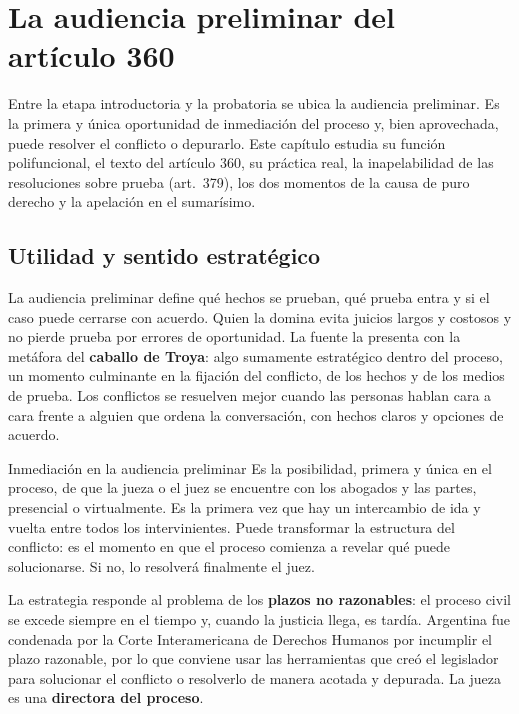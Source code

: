 \documentclass[12pt,oneside]{book}
\begin{document}
\chapter{La audiencia preliminar del artículo 360}\label{cap:audiencia}

Entre la etapa introductoria y la probatoria se ubica la audiencia preliminar. Es la primera y única oportunidad de inmediación del proceso y, bien aprovechada, puede resolver el conflicto o depurarlo. Este capítulo estudia su función polifuncional, el texto del artículo 360, su práctica real, la inapelabilidad de las resoluciones sobre prueba (art.~379), los dos momentos de la causa de puro derecho y la apelación en el sumarísimo.

\section{Utilidad y sentido estratégico}

La audiencia preliminar define qué hechos se prueban, qué prueba entra y si el caso puede cerrarse con acuerdo. Quien la domina evita juicios largos y costosos y no pierde prueba por errores de oportunidad. La fuente la presenta con la metáfora del \textbf{caballo de Troya}: algo sumamente estratégico dentro del proceso, un momento culminante en la fijación del conflicto, de los hechos y de los medios de prueba. Los conflictos se resuelven mejor cuando las personas hablan cara a cara frente a alguien que ordena la conversación, con hechos claros y opciones de acuerdo.

\begin{definition}{Inmediación en la audiencia preliminar}
Es la posibilidad, primera y única en el proceso, de que la jueza o el juez se encuentre con los abogados y las partes, presencial o virtualmente. Es la primera vez que hay un intercambio de ida y vuelta entre todos los intervinientes. Puede transformar la estructura del conflicto: es el momento en que el proceso comienza a revelar qué puede solucionarse. Si no, lo resolverá finalmente el juez.
\end{definition}

La estrategia responde al problema de los \textbf{plazos no razonables}: el proceso civil se excede siempre en el tiempo y, cuando la justicia llega, es tardía. Argentina fue condenada por la Corte Interamericana de Derechos Humanos por incumplir el plazo razonable, por lo que conviene usar las herramientas que creó el legislador para solucionar el conflicto o resolverlo de manera acotada y depurada. La jueza es una \textbf{directora del proceso}.
\end{document}
